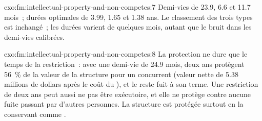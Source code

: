 \begin{solution}{exo:fm:intellectual-property-and-non-competes:7}
Demi-vies de 23.9, 6.6 et 11.7 mois~; durées optimales de 3.99, 1.65 et 1.38 ans. Le classement des trois types est inchangé~; les durées varient de
quelques mois, autant que le bruit dans les demi-vies calibrées.
\end{solution}

\begin{solution}{exo:fm:intellectual-property-and-non-competes:8}
La protection ne dure que le temps de la restriction~: avec une demi-vie de 24.9 mois, deux ans protègent 56~\% de la valeur de la structure pour un concurrent
(valeur nette de 5.38 millions de dollars après le coût du ), et le reste fuit à son terme. Une restriction de deux ans peut aussi ne pas être exécutoire, et elle ne
protège contre aucune fuite passant par d'autres personnes. La structure est protégée surtout en la conservant comme .
\end{solution}

